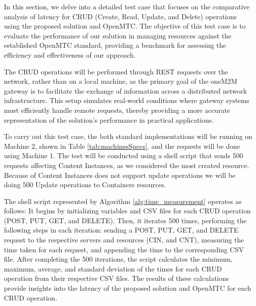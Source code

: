 \documentclass[a4paper,fleqn]{cas-dc}
\begin{document}
In this section, we delve into a detailed test case that focuses on the comparative analysis of latency for CRUD (Create, Read, Update, and Delete) operations using the proposed solution and OpenMTC. The objective of this test case is to evaluate the performance of our solution in managing resources against the established OpenMTC standard, providing a benchmark for assessing the efficiency and effectiveness of our approach.

The CRUD operations will be performed through REST requests over the network, rather than on a local machine, as the primary goal of the oneM2M gateway is to facilitate the exchange of information across a distributed network infrastructure. This setup simulates real-world conditions where gateway systems must efficiently handle remote requests, thereby providing a more accurate representation of the solution's performance in practical applications.

To carry out this test case, the both standard implementations will be running on Machine 2, shown in Table \ref{tab:machinesSpecs}, and the requests will be done using Machine 1. The test will be conducted using a shell script that sends 500 requests affecting Content Instances, as we considered the most created resource. Because of Content Instances does not support update operations we will be doing 500 Update operations to Containers resources.

The shell script represented by Algorithm \ref{alg:time_measurement} operates as follows: It begins by initializing variables and CSV files for each CRUD operation (POST, PUT, GET, and DELETE). Then, it iterates 500 times, performing the following steps in each iteration: sending a POST, PUT, GET, and DELETE request to the respective servers and resources (CIN, and CNT), measuring the time taken for each request, and appending the time to the corresponding CSV file. After completing the 500 iterations, the script calculates the minimum, maximum, average, and standard deviation of the times for each CRUD operation from their respective CSV files. The results of these calculations provide insights into the latency of the proposed solution and OpenMTC for each CRUD operation.
\end{document}
